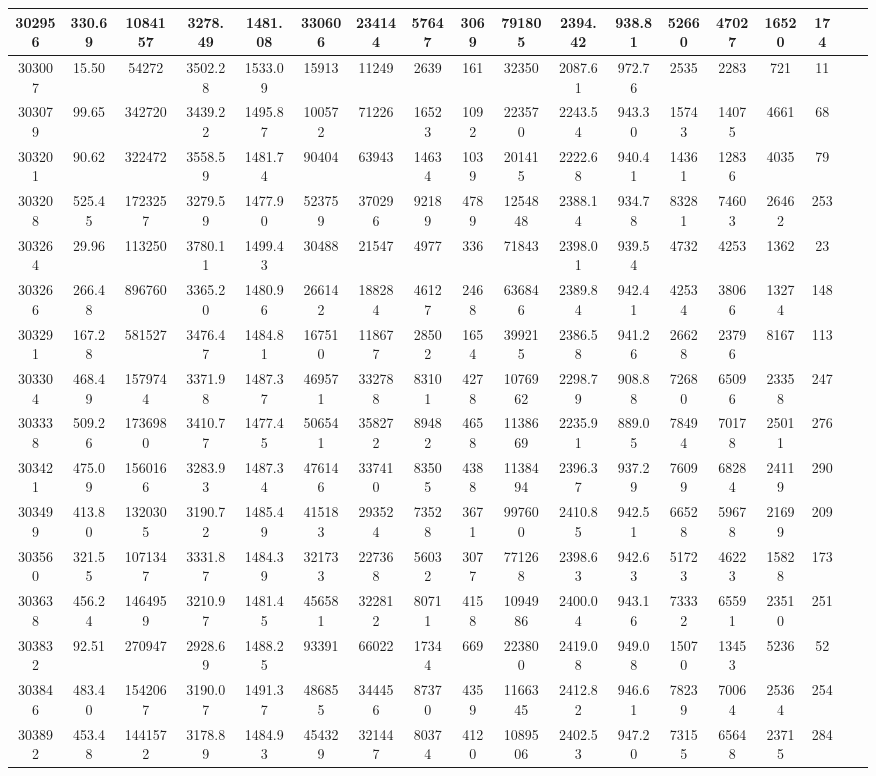 \documentclass[10pt]{extarticle}
\begin{document}
\begin{longtable}{|c|c|c|c|c|c|c|c|c|c|c|c|c|c|c|c|c|c|}
\hline 
302956&330.69&1084157&3278.49&1481.08&330606&234144&57647&3069&791805&2394.42&938.81&52660&47027&16520&174 \\ 
\hline 
303007&15.50&54272&3502.28&1533.09&15913&11249&2639&161&32350&2087.61&972.76&2535&2283&721&11 \\ 
\hline 
303079&99.65&342720&3439.22&1495.87&100572&71226&16523&1092&223570&2243.54&943.30&15743&14075&4661&68 \\ 
\hline 
303201&90.62&322472&3558.59&1481.74&90404&63943&14634&1039&201415&2222.68&940.41&14361&12836&4035&79 \\ 
\hline 
303208&525.45&1723257&3279.59&1477.90&523759&370296&92189&4789&1254848&2388.14&934.78&83281&74603&26462&253 \\ 
\hline 
303264&29.96&113250&3780.11&1499.43&30488&21547&4977&336&71843&2398.01&939.54&4732&4253&1362&23 \\ 
\hline 
303266&266.48&896760&3365.20&1480.96&266142&188284&46127&2468&636846&2389.84&942.41&42534&38066&13274&148 \\ 
\hline 
303291&167.28&581527&3476.47&1484.81&167510&118677&28502&1654&399215&2386.58&941.26&26628&23796&8167&113 \\ 
\hline 
303304&468.49&1579744&3371.98&1487.37&469571&332788&83101&4278&1076962&2298.79&908.88&72680&65096&23358&247 \\ 
\hline 
303338&509.26&1736980&3410.77&1477.45&506541&358272&89482&4658&1138669&2235.91&889.05&78494&70178&25011&276 \\ 
\hline 
303421&475.09&1560166&3283.93&1487.34&476146&337410&83505&4388&1138494&2396.37&937.29&76099&68284&24119&290 \\ 
\hline 
303499&413.80&1320305&3190.72&1485.49&415183&293524&73528&3671&997600&2410.85&942.51&66528&59678&21699&209 \\ 
\hline 
303560&321.55&1071347&3331.87&1484.39&321733&227368&56032&3077&771268&2398.63&942.63&51723&46223&15828&173 \\ 
\hline 
303638&456.24&1464959&3210.97&1481.45&456581&322812&80711&4158&1094986&2400.04&943.16&73332&65591&23510&251 \\ 
\hline 
303832&92.51&270947&2928.69&1488.25&93391&66022&17344&669&223800&2419.08&949.08&15070&13453&5236&52 \\ 
\hline 
303846&483.40&1542067&3190.07&1491.37&486855&344456&87370&4359&1166345&2412.82&946.61&78239&70064&25364&254 \\ 
\hline 
303892&453.48&1441572&3178.89&1484.93&454329&321447&80374&4120&1089506&2402.53&947.20&73155&65648&23715&284 \\ 

\end{longtable}
\end{document}
